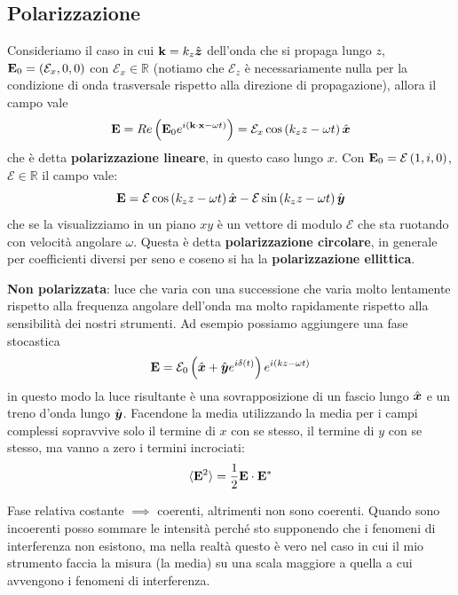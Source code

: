 \subsection{Polarizzazione}
Consideriamo il caso in cui $ \mathbf{ k } = k_z \hat{\boldsymbol{z}} $ dell'onda che si propaga lungo $ z $, $ \mathbf{ E }_0 = (\mathcal{E}_x, 0 , 0)$ 
con $ \mathcal{E}_x \in \mathbb{R} $ (notiamo che $ \mathcal{E}_z $ è necessariamente nulla per la condizione di onda trasversale rispetto alla 
direzione di propagazione), allora il campo vale
\begin{equation}
  \mathbf{ E } = Re \left( \mathbf{ E }_0 e^{i\left( \mathbf{ k\cdot x} - \omega t \right)} \right) 
  = \mathcal{E}_x \cos \left( k_z z - \omega t \right) \hat{\boldsymbol{x}}
\end{equation}
che è detta \textbf{polarizzazione lineare}, in questo caso lungo $ x $. Con $ \mathbf{ E }_0 =  \mathcal{E} \left( 1, i, 0 \right) $, 
$ \mathcal{E}\in \mathbb{R} $ il campo vale:
\begin{equation}
  \mathbf{ E } = \mathcal{E} \cos \left( k_z z - \omega t \right) \hat{\boldsymbol{x}} - \mathcal{E} \sin \left( k_z z - \omega t \right) \hat{\boldsymbol{y}}
\end{equation}
che se la visualizziamo in un piano $ xy $ è un vettore di modulo $ \mathcal{E} $ che sta ruotando con velocità angolare $ \omega $. Questa 
è detta \textbf{polarizzazione circolare}, in generale per coefficienti diversi per seno e coseno si ha la \textbf{polarizzazione ellittica}.

\textbf{Non polarizzata}: luce che varia con una successione che varia molto lentamente rispetto alla frequenza angolare dell'onda ma molto 
rapidamente rispetto alla sensibilità dei nostri strumenti. Ad esempio possiamo aggiungere una fase stocastica 
\begin{align}
  \mathbf{ E } = \mathcal{E}_0 \left( \hat{\boldsymbol{x}} + \hat{\boldsymbol{y}} e^{i\delta(t)}\right) e^{i (kz - \omega t)}
\end{align}
in questo modo la luce risultante è una sovrapposizione di un fascio lungo $ \hat{\boldsymbol{x}} $ e un treno d'onda lungo $ \hat{\boldsymbol{y}} $. Facendone la media 
utilizzando la media per i campi complessi sopravvive solo il termine di $ x $ con se stesso, il termine di $ y $ con se stesso, ma vanno a zero i 
termini incrociati:
\begin{align}
  \langle \mathbf{ E }^2 \rangle = \frac{1}{2} \mathbf{ E } \cdot \mathbf{ E }^*
\end{align}

Fase relativa costante $ \implies $ coerenti, altrimenti non sono coerenti. Quando sono incoerenti posso sommare le intensità perché sto supponendo 
che i fenomeni di interferenza non esistono, ma nella realtà questo è vero nel caso in cui il mio strumento faccia la misura (la media) su una scala 
maggiore a quella a cui avvengono i fenomeni di interferenza. 
